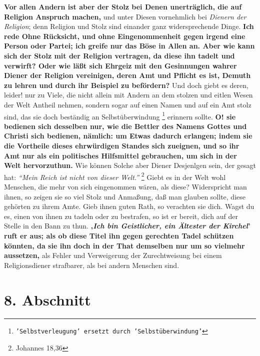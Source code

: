 \textbf{Vor allen Andern ist aber der Stolz bei Denen
unerträglich, die auf Religion
Anspruch machen,} und unter Diesen vornehmlich bei \textit{Dienern der
Religion}; denn
Religion und Stolz sind einander ganz widersprechende Dinge. \textbf{Ich rede
Ohne
Rücksicht, und ohne Eingenommenheit gegen irgend eine Person oder Partei; ich
greife nur das Böse in Allen an. Aber wie kann sich der Stolz
mit der Religion
vertragen, da diese ihn tadelt und verwirft? Oder wie läßt sich Ehrgeiz mit den
Gesinnungen wahrer Diener der Religion vereinigen, deren Amt und Pflicht es ist,
Demuth zu lehren und durch ihr Beispiel zu befördern?} Und doch giebt es deren,
leider! nur zu Viele, die nicht allein mit Andern an dem stolzen und eitlen
Wesen der Welt Antheil nehmen, sondern sogar auf einen Namen und auf ein Amt
stolz sind, das sie doch beständig an
Selbstüberwindung
\footnote{\texttt{'Selbstverleugung' ersetzt durch 'Selbstüberwindung'}}
erinnern sollte. \textbf{O! sie
bedienen sich desselben nur, wie die Bettler des Namens Gottes und Christi sich
bedienen, nämlich: um Etwas dadurch erlangen; indem sie die Vortheile dieses
ehrwürdigen Standes sich zueignen, und so ihr Amt nur als ein politisches
Hilfsmittel gebrauchen, um sich in der Welt hervorzuthun.} Wie können Solche
aber
Diener Desjenlgen sein, der gesagt hat:
\textit{"`Mein Reich ist nicht von dieser
Welt."'}
\footnote{Johannes 18,36}
Giebt es in der Welt wohl Menschen, die mehr von
sich eingenommen wären, als diese? Widerspricht man ihnen, so zeigen sie so viel
Stolz und Anmaßung, daß man glauben sollte, diese gehörten zu ihrem Amte. Gieb
ihnen guten Rath, so verachten sie dich. Wagst du es, einen von ihnen zu tadeln
oder zu bestrafen, so ist er bereit, dich auf der Stelle in den Bann
zu thun.
\textbf{‚\textit{Ich bin Geistlicher, ein Ältester der Kirchel}’ ruft er aus;
als ob diese Titel
ihn gegen gerechten Tadel schützen könnten, da sie ihn doch in der That
demselben nur um so vielmehr aussetzen,} als Fehler und Verweigerung der
Zurechtweisung bei einem Religionsdiener strafbarer, als bei andern Menschen
sind.

\section{8. Abschnitt} \label{kap12_ab8}

